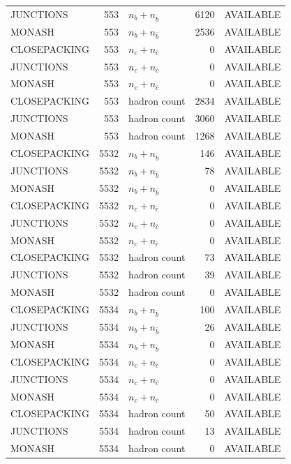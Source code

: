\begin{landscape}
\begin{longtable}{@{}lrlrl@{}}
JUNCTIONS & 553 & $n_b+n_{\bar b}$ & \num{6120} & AVAILABLE \\
MONASH & 553 & $n_b+n_{\bar b}$ & \num{2536} & AVAILABLE \\
CLOSEPACKING & 553 & $n_c+n_{\bar c}$ & \num{0} & AVAILABLE \\
JUNCTIONS & 553 & $n_c+n_{\bar c}$ & \num{0} & AVAILABLE \\
MONASH & 553 & $n_c+n_{\bar c}$ & \num{0} & AVAILABLE \\
CLOSEPACKING & 553 & hadron count & \num{2834} & AVAILABLE \\
JUNCTIONS & 553 & hadron count & \num{3060} & AVAILABLE \\
MONASH & 553 & hadron count & \num{1268} & AVAILABLE \\
CLOSEPACKING & 5532 & $n_b+n_{\bar b}$ & \num{146} & AVAILABLE \\
JUNCTIONS & 5532 & $n_b+n_{\bar b}$ & \num{78} & AVAILABLE \\
MONASH & 5532 & $n_b+n_{\bar b}$ & \num{0} & AVAILABLE \\
CLOSEPACKING & 5532 & $n_c+n_{\bar c}$ & \num{0} & AVAILABLE \\
JUNCTIONS & 5532 & $n_c+n_{\bar c}$ & \num{0} & AVAILABLE \\
MONASH & 5532 & $n_c+n_{\bar c}$ & \num{0} & AVAILABLE \\
CLOSEPACKING & 5532 & hadron count & \num{73} & AVAILABLE \\
JUNCTIONS & 5532 & hadron count & \num{39} & AVAILABLE \\
MONASH & 5532 & hadron count & \num{0} & AVAILABLE \\
CLOSEPACKING & 5534 & $n_b+n_{\bar b}$ & \num{100} & AVAILABLE \\
JUNCTIONS & 5534 & $n_b+n_{\bar b}$ & \num{26} & AVAILABLE \\
MONASH & 5534 & $n_b+n_{\bar b}$ & \num{0} & AVAILABLE \\
CLOSEPACKING & 5534 & $n_c+n_{\bar c}$ & \num{0} & AVAILABLE \\
JUNCTIONS & 5534 & $n_c+n_{\bar c}$ & \num{0} & AVAILABLE \\
MONASH & 5534 & $n_c+n_{\bar c}$ & \num{0} & AVAILABLE \\
CLOSEPACKING & 5534 & hadron count & \num{50} & AVAILABLE \\
JUNCTIONS & 5534 & hadron count & \num{13} & AVAILABLE \\
MONASH & 5534 & hadron count & \num{0} & AVAILABLE \\

\end{longtable}
\end{landscape}
